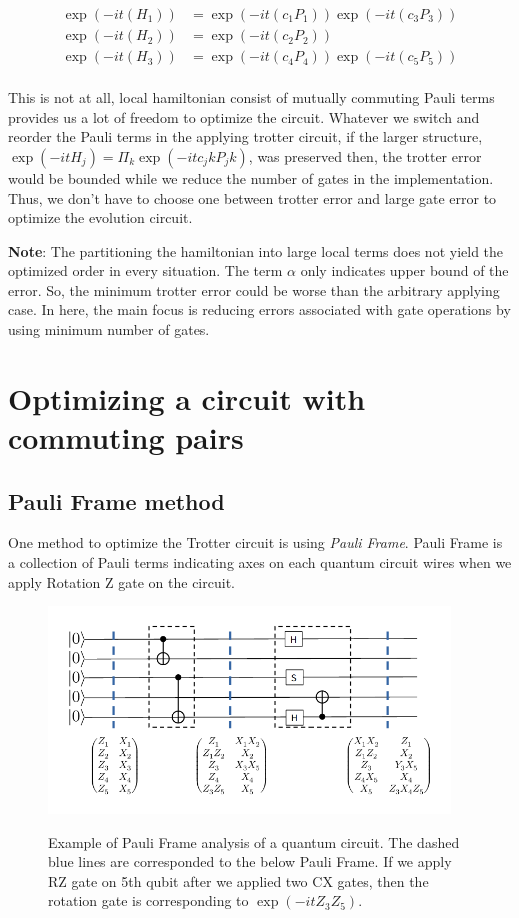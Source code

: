 \documentclass[a4paper,12pt]{article}
\begin{document}
\begin{align}
    \exp(- i t (H_1)) &= \exp(- i t (c_1 P_1)) \exp(- i t (c_3 P_3)) \\ 
    \exp(- i t (H_2)) &= \exp(- i t (c_2 P_2))\\
    \exp(- i t (H_3)) &= \exp(- i t (c_4 P_4)) \exp(- i t (c_5 P_5)) \\ 
\end{align}

This is not at all, local hamiltonian consist of mutually commuting Pauli terms provides us a lot of freedom
to optimize the circuit. 
Whatever we switch and reorder the Pauli terms in the applying trotter circuit,
if the larger structure, $\exp(-it H_j) = \Pi_k \exp(-it c_jk P_jk)$, was preserved then, 
the trotter error would be bounded while we reduce the number of gates in the implementation.
Thus, we don't have to choose one between trotter error and large gate error
to optimize the evolution circuit.

\textbf{Note}: The partitioning the hamiltonian into large local terms does not yield the optimized 
order in every situation. 
The term $\alpha$ only indicates upper bound of the error. So, the minimum trotter error could be 
worse than the arbitrary applying case. 
In here, the main focus is reducing errors associated with gate operations by using minimum number of gates.


\section{Optimizing a circuit with commuting pairs}

\subsection{Pauli Frame method}

One method to optimize the Trotter circuit is using \textit{Pauli Frame}\cite{schmitz_graph_2023}.
Pauli Frame is a collection of Pauli terms indicating axes on each quantum circuit wires
when we apply Rotation Z gate on the circuit.

\begin{figure}
    \centering
    \includegraphics[width = 0.95\textwidth]{figures/Pauli Frame.png}
    \label{fig:Pauli Frame}
    \caption{
        Example of Pauli Frame analysis of a quantum circuit. 
        The dashed blue lines are corresponded to the below Pauli Frame.
        If we apply RZ gate on 5th qubit after we applied two CX gates,
        then the rotation gate is corresponding to $\exp(-i t Z_3Z_5)$.
    }
\end{figure}
\end{document}
